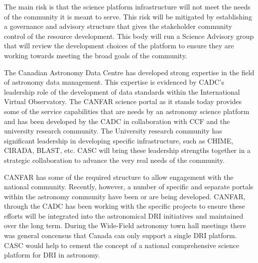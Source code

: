 \documentclass[11pt]{article}
\begin{document}
\begin{lrptextbox}
The main risk is that the science platform infrastructure will not meet the needs of the community it is meant to serve.  This risk will be mitigated by establishing a governance and advisory structure that gives the stakeholder community control of the resource development.  This body will run a Science Advisory group that will review the development choices of the platform to ensure they are working towards meeting the broad goals of the community.  
\end{lrptextbox}

\begin{lrptextbox} 
The Canadian Astronomy Data Centre has developed strong expertise in the field of  astronomy data management. This expertise is evidenced by CADC's leadership role of the development of data standards within the International Virtual Observatory.  The CANFAR science portal as it stands today provides some of the service capabilities that are needs by an astronomy science platform and has been developed by the CADC in collaboration with CCF and the university research community. 
The University research community has significant leadership in developing specific infrastructure, such as CHIME, CIRADA, BLAST, etc.  CASC will bring these leadership strengths together in a strategic collaboration to advance the very real needs of the community.
\end{lrptextbox}

\begin{lrptextbox} 
CANFAR has some of the required structure to allow engagement with the national community.  
Recently, however, a number of  specific and separate portals within the astronomy community have been or are being developed. 
CANFAR, through the CADC has been working with the specific projects to ensure these efforts will be integrated into the astronomical DRI initiatives and maintained over the long term.
During the Wide-Field astronomy town hall meetings there was general concensus that Canada can only support a single DRI platform.
CASC would help to cement the concept of a national comprehensive science platform for DRI in astronomy. 
\end{lrptextbox}
\end{document}
